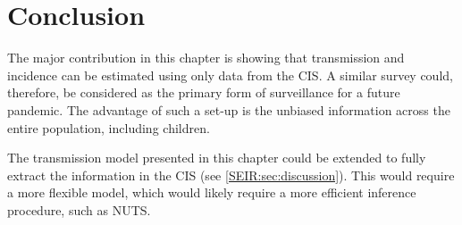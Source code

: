 \documentclass[thesis.tex]{subfiles}
\begin{document}
\section{Conclusion}

The major contribution in this chapter is showing that transmission and incidence can be estimated using only data from the CIS.
A similar survey could, therefore, be considered as the primary form of surveillance for a future pandemic.
The advantage of such a set-up is the unbiased information across the entire population, including children.

The transmission model presented in this chapter could be extended to fully extract the information in the CIS (see \cref{SEIR:sec:discussion}).
This would require a more flexible model, which would likely require a more efficient inference procedure, such as NUTS.

\ifSubfilesClassLoaded{
  \appendix
  
  
  
  \listoftodos
}{}
\end{document}
